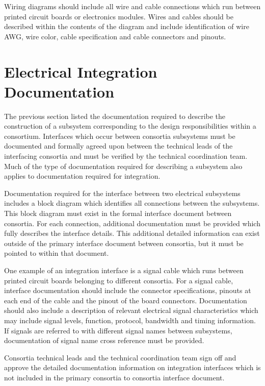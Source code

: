 Wiring diagrams should include all wire and cable connections which
run between printed circuit boards or electronics modules.  Wires and
cables should be described within the contents of the diagram and
include identification of wire AWG, wire color, cable specification
and cable connectors and pinouts.


\section{Electrical Integration Documentation}
\label{sec:fdsp-coord-integ-electrical}
The previous section listed the documentation required to describe the
construction of a subsystem corresponding to the design
responsibilities within a consortium.  Interfaces which occur between
consortia subsystems must be documented and formally agreed upon
between the technical leads of the interfacing consortia and must be
verified by the technical coordination team.  Much of the type of
documentation required for describing a subsystem also applies to
documentation required for integration.

Documentation required for the interface between two electrical
subsystems includes a block diagram which identifies all connections
between the subsystems.  This block diagram must exist in the formal
interface document between consortia.  For each connection, additional
documentation must be provided which fully describes the interface
details. This additional detailed information can exist outside of the
primary interface document between consortia, but it must be pointed
to within that document.

One example of an integration interface is a signal cable which runs
between printed circuit boards belonging to different consortia.  For
a signal cable, interface documentation should include the connector
specifications, pinouts at each end of the cable and the pinout of the
board connectors.  Documentation should also include a description of
relevant electrical signal characteristics which may include signal
levels, function, protocol, bandwidth and timing information.  If
signals are referred to with different signal names between
subsystems, documentation of signal name cross reference must be
provided.

Consortia technical leads and the technical coordination team sign off
and approve the detailed documentation information on integration
interfaces which is not included in the primary consortia to consortia
interface document.


